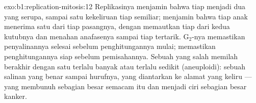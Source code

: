 \begin{solution}{exo:b1:replication-mitosis:12}
Replikasinya menjamin bahwa tiap  menjadi dua  yang
serupa, sampai satu kekeliruan tiap semiliar;  menjamin
bahwa tiap  anak menerima satu dari tiap pasangnya, dengan
memautkan tiap  dari kedua kutubnya dan menahan anafasenya
sampai tiap  tertarik.  G$_2$-nya
memastikan penyalinannya selesai sebelum penghitungannya mulai;   memastikan penghitungannya siap sebelum
pemisahannya. Sebuah  yang salah memilah berakhir dengan satu
 terlalu banyak atau terlalu sedikit (aneuploidi): sebuah
salinan yang benar sampai hurufnya, yang diantarkan ke alamat yang
keliru --- yang membunuh sebagian besar  semacam itu dan menjadi ciri
sebagian besar kanker.
\end{solution}

